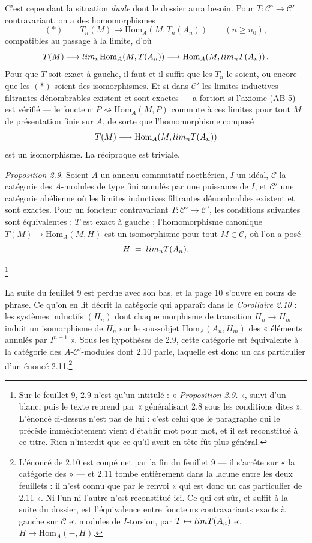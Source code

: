 \documentclass[11pt,a4paper]{article}
\begin{document}
C'est cependant la situation \emph{duale} dont le dossier aura besoin. Pour
$T : \mathcal{C}^{\circ} \to \mathcal{C}'$ contravariant, on a des
homomorphismes
\[
  (\ast) \qquad
  T_{n}(M) \longrightarrow \mathrm{Hom}_{A}(M, T_{n}(A_{n}))
  \qquad (n \geqslant n_{0}) ,
\]
compatibles au passage à la limite, d'où
\[
  T(M) \longrightarrow \varinjlim_{n} \mathrm{Hom}_{A}(M, T(A_{n}))
  \longrightarrow \mathrm{Hom}_{A}\!\left(M, \varinjlim_{n} T(A_{n})\right) .
\]
Pour que $T$ soit exact à gauche, il faut et il suffit que les $T_{n}$ le
soient, ou encore que les $(\ast)$ soient des isomorphismes. Et si dans
$\mathcal{C}'$ les limites inductives filtrantes dénombrables existent et sont
exactes — a fortiori si l'axiome (AB 5) est vérifié — le foncteur
$P \rightsquigarrow \mathrm{Hom}_{A}(M,P)$ commute à ces limites pour tout $M$
de présentation finie sur $A$, de sorte que l'homomorphisme composé
\[
  T(M) \longrightarrow \mathrm{Hom}_{A}\!\left(M, \varinjlim_{n} T(A_{n})\right)
\]
est un isomorphisme. La réciproque est triviale.

\emph{Proposition 2.9.} Soient $A$ un anneau commutatif noethérien, $I$ un
idéal, $\mathcal{C}$ la catégorie des $A$-modules de type fini annulés par une
puissance de $I$, et $\mathcal{C}'$ une catégorie abélienne où les limites
inductives filtrantes dénombrables existent et sont exactes. Pour un foncteur
contravariant $T : \mathcal{C}^{\circ} \to \mathcal{C}'$, les conditions
suivantes sont équivalentes : $T$ est exact à gauche ; l'homomorphisme canonique
$T(M) \to \mathrm{Hom}_{A}(M, H)$ est un isomorphisme pour tout
$M \in \mathcal{C}$, où l'on a posé
\[
  H \;=\; \varinjlim_{n} T(A_{n}) .
\]

\footnote{Sur le feuillet 9, 2.9 n'est qu'un intitulé : « \emph{Proposition
2.9.} », suivi d'un blanc, puis le texte reprend par « généralisant 2.8 sous les
conditions dites ». L'énoncé ci-dessus n'est pas de lui : c'est celui que le
paragraphe qui le précède immédiatement vient d'établir mot pour mot, et il est
reconstitué à ce titre. Rien n'interdit que ce qu'il avait en tête fût plus
général.}

La suite du feuillet 9 est perdue avec son bas, et la page 10 s'ouvre en cours
de phrase. Ce qu'on en lit décrit la catégorie qui apparaît dans le
\emph{Corollaire 2.10} : les systèmes inductifs $(H_{n})$ dont chaque morphisme
de transition $H_{n} \to H_{m}$ induit un isomorphisme de $H_{n}$ sur le
sous-objet $\mathrm{Hom}_{A}(A_{n}, H_{m})$ des « éléments annulés par
$I^{n+1}$ ». Sous les hypothèses de 2.9, cette catégorie est équivalente à la
catégorie des $A$-$\mathcal{C}'$-modules dont 2.10 parle, laquelle est donc un
cas particulier d'un énoncé 2.11.\footnote{L'énoncé de 2.10 est coupé net par la
fin du feuillet 9 — il s'arrête sur « la catégorie des » — et 2.11 tombe
entièrement dans la lacune entre les deux feuillets : il n'est connu que par le
renvoi « qui est donc un cas particulier de 2.11 ». Ni l'un ni l'autre n'est
reconstitué ici. Ce qui est sûr, et suffit à la suite du dossier, est
l'équivalence entre foncteurs contravariants exacts à gauche sur $\mathcal{C}$ et
modules de $I$-torsion, par $T \mapsto \varinjlim T(A_{n})$ et
$H \mapsto \mathrm{Hom}_{A}(-,H)$.}
\end{document}
